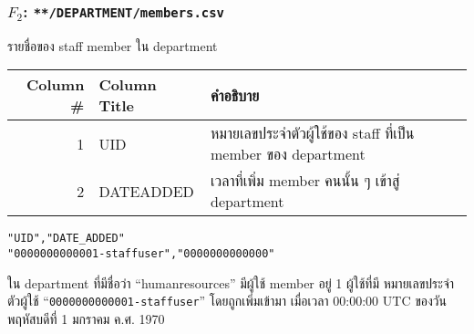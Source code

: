 \begin{minipage}{\textwidth}
\subsubsection{\texorpdfstring{$ F_{2} $}{File \#2}: \texttt{**/DEPARTMENT/members.csv}}\label{subsubsec:csv-f2}

รายชื่อของ staff member ใน department

\begin{tabular}[!hbt]{| r | >{\ttfamily}p{15ex}<{\rmfamily} | p{36ex} |}
\hline
Column \#       & \rmfamily Column Title                & คำอธิบาย\\
\hline
1               & UID                                   & หมายเลขประจำตัวผู้ใช้ของ staff ที่เป็น member ของ department \\
2               & DATE\textunderscore{}ADDED            & เวลาที่เพิ่ม member คนนั้น ๆ เข้าสู่ department\\
\hline
\end{tabular}


\begin{lstlisting}[caption={\texttt{data/deps/human\textunderscore{}resources/members.csv}}]
"UID","DATE_ADDED"
"0000000000001-staffuser","0000000000000"
\end{lstlisting}

\begin{description}[labelwidth=*]
    \item[$ \Rightarrow $]  ใน department ที่มีชื่อว่า ``human\textunderscore{}resources'' มีผู้ใช้ member อยู่ 1 ผู้ใช้ที่มี
\mbox{หมายเลขประจำตัวผู้ใช้} ``\texttt{0000000000001-staffuser}'' โดยถูกเพิ่มเข้ามา\relax
เมื่อเวลา 00:00:00 UTC ของวันพฤหัสบดีที่ 1 มกราคม ค.ศ. 1970
\end{description}
\end{minipage}


